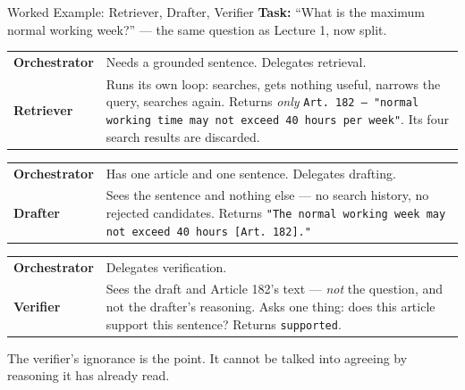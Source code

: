 \begin{frame}{Worked Example: Retriever, Drafter, Verifier}
\footnotesize
\textbf{Task:} ``What is the maximum normal working week?'' --- the same question as Lecture 1, now split.
\smallskip

\scriptsize
\begin{tabular}{@{}p{1.9cm}p{}@{}}
\textcolor{RLBlue}{\textbf{Orchestrator}} & Needs a grounded sentence. Delegates retrieval. \\[2pt]
\textcolor{RLGreen}{\textbf{Retriever}}    & Runs its own loop: searches, gets nothing useful, narrows the query, searches again. Returns \emph{only} \texttt{Art.~182 -- "normal working time may not exceed 40 hours per week"}. Its four search results are discarded. \\
\end{tabular}
\pause

\begin{tabular}{@{}p{1.9cm}p{}@{}}
\textcolor{RLBlue}{\textbf{Orchestrator}} & Has one article and one sentence. Delegates drafting. \\[2pt]
\textcolor{RLGreen}{\textbf{Drafter}}      & Sees the sentence and nothing else --- no search history, no rejected candidates. Returns \texttt{"The normal working week may not exceed 40 hours [Art.~182]."} \\
\end{tabular}
\pause

\begin{tabular}{@{}p{1.9cm}p{}@{}}
\textcolor{RLBlue}{\textbf{Orchestrator}} & Delegates verification. \\[2pt]
\textcolor{RLGreen}{\textbf{Verifier}}     & Sees the draft and Article 182's text --- \emph{not} the question, and not the drafter's reasoning. Asks one thing: does this article support this sentence? Returns \texttt{supported}. \\
\end{tabular}
\pause

\smallskip
\footnotesize The verifier's ignorance is the point. It cannot be talked into agreeing by reasoning it has already read.
\end{frame}

